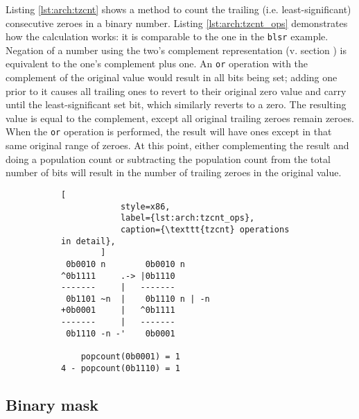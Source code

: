 Listing \ref{lst:arch:tzcnt} shows a method to count the trailing (i.e.
least-significant) consecutive zeroes in a binary number.  Listing
\ref{lst:arch:tzcnt_ops} demonstrates how the calculation works: it is
comparable to the one in the \texttt{blsr} example.  Negation of a number using
the two's complement representation (v. section
) is equivalent to the one's complement plus
one.  An \texttt{or} operation with the complement of the original value would
result in all bits being set; adding one prior to it causes all trailing ones to
revert to their original zero value and carry until the least-significant set
bit, which similarly reverts to a zero.  The resulting value is equal to the
complement, except all original trailing zeroes remain zeroes.  When the
\texttt{or} operation is performed, the result will have ones except in that
same original range of zeroes.  At this point, either complementing the result
and doing a population count or subtracting the population count from the total
number of bits will result in the number of trailing zeroes in the original
value.

\begin{figure}[ht]
    \centering
    \vspace{-\baselineskip}
    \begin{subfigure}[t]{0.5\textwidth}
        
    \end{subfigure}
    \hspace{4em}
    \begin{subfigure}[t]{0.375\textwidth}
        \begin{lstlisting}[
            style=x86,
            label={lst:arch:tzcnt_ops},
            caption={\texttt{tzcnt} operations in detail},
        ]
 0b0010 n        0b0010 n
^0b1111     .-> |0b1110
-------     |   -------
 0b1101 ~n  |    0b1110 n | -n
+0b0001     |   ^0b1111
-------     |   -------
 0b1110 -n -'    0b0001

    popcount(0b0001) = 1
4 - popcount(0b1110) = 1
        \end{lstlisting}
    \end{subfigure}
    \vspace{-2\baselineskip}
\end{figure}

\subsection{Binary mask}

